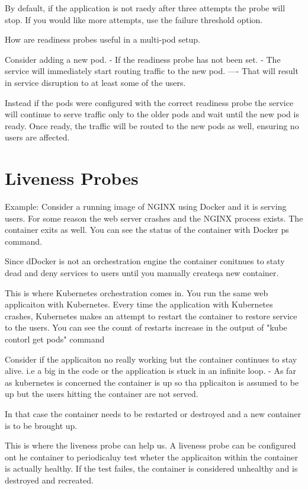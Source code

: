 \documentclass[11pt]{book}
\begin{document}
    By default, if the application is not raedy after three attempts the probe will stop.
    If you would like more attempts, use the failure threshold option.

    How are readiness probes useful in a multi-pod setup.

    Consider adding a new pod.
    - If the readiness probe has not been set.
    - The service will immediately start routing traffic to the new pod.
    ---- That will result in service disruption to at least some of the users.

    Instead if the pods were configured with the correct readiness probe the service will continue to serve traffic only to the older pods and wait until the new pod is ready.
    Once ready, the traffic will be routed to the new pods as well, ensuring no users are affected.

    \section{Liveness Probes}
    Example:
    Consider a running image of NGINX using Docker and it is serving users.
    For some reason the web server crashes and the NGINX process exists.
    The container exits as well.
    You can see the status of the container with Docker ps command.

    Since dDocker is not an orchestration engine the container conitnues to staty dead and deny services to users until you manually createqa new container.

    This is where Kubernetes orchestration comes in.
    You run the same web applicaiton with Kubernetes.
    Every time the application with Kubernetes crashes, Kubernetes makes an attempt to restart the container to restore service to the users.
    You can see the count of restarts increase in the output of "kube contorl get pods" command


    Consider if the applicaiton no really working but the container continues to stay alive.
    i.e a big in the code or the application is stuck in an infinite loop.
    - As far as kubernetes is concerned the container is up so tha pplicaiton is assumed to be up but the users hitting the container are not served.

    In that case the container needs to be restarted or destroyed and a new container is to be brought up.

    This is where the liveness probe can help us.
    A liveness probe can be configured ont he container to periodicaluy test wheter the applicaiton within the container is actually healthy.
    If the test failes, the container is considered unhealthy and is destroyed and recreated.
\end{document}
